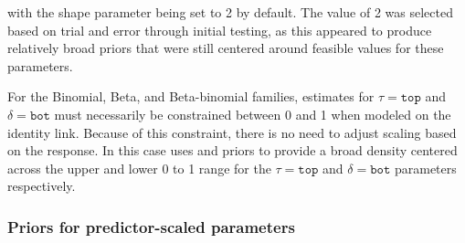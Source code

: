 \documentclass[
  shortnames]{jss}
\begin{document}
with the shape parameter being set to 2 by default. The value of 2 was selected based on trial and error through initial testing, as this appeared to produce relatively broad priors that were still centered around feasible values for these parameters.

For the Binomial, Beta, and Beta-binomial families, estimates for \(\tau = \mathtt{top}\) and \(\delta = \mathtt{bot}\) must necessarily be constrained between 0 and 1 when modeled on the identity link. Because of this constraint, there is no need to adjust scaling based on the response. In this case  uses  and  priors to provide a broad density centered across the upper and lower 0 to 1 range for the \(\tau = \mathtt{top}\) and \(\delta = \mathtt{bot}\) parameters respectively.

\hypertarget{priors-for-predictor-scaled-parameters}{%
\subsubsection{Priors for predictor-scaled parameters}\label{priors-for-predictor-scaled-parameters}}
\end{document}
